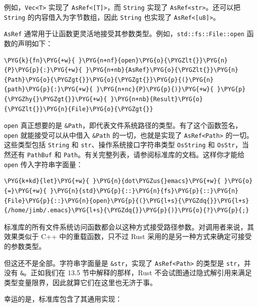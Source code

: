 例如，\texttt{Vec<T>} 实现了 \texttt{AsRef<[T]>}，而 \texttt{String} 实现了 \texttt{AsRef<str>}。还可以把 \texttt{String} 的内容借入为字节数组，因此 \texttt{String} 也实现了 \texttt{AsRef<[u8]>}。

\texttt{AsRef} 通常用于让函数更灵活地接受其参数类型。例如，\texttt{std::fs::File::open} 函数的声明如下：

\begin{Verbatim}[commandchars=\\\{\},breaklines=true,breakanywhere=true,fontsize=\codefont,xleftmargin=17bp]
\PYG{k}{fn}\PYG{+w}{ }\PYG{n+nf}{open}\PYG{o}{\PYGZlt{}}\PYG{n}{P}\PYG{p}{:}\PYG{+w}{ }\PYG{n+nb}{AsRef}\PYG{o}{\PYGZlt{}}\PYG{n}{Path}\PYG{o}{\PYGZgt{}}\PYG{o}{\PYGZgt{}}\PYG{p}{(}\PYG{n}{path}\PYG{p}{:}\PYG{+w}{ }\PYG{n+nc}{P}\PYG{p}{)}\PYG{+w}{ }\PYG{p}{\PYGZhy{}\PYGZgt{}}\PYG{+w}{ }\PYG{n+nb}{Result}\PYG{o}{\PYGZlt{}}\PYG{n}{File}\PYG{o}{\PYGZgt{}}
\end{Verbatim}

\texttt{open} 真正想要的是 \texttt{\&Path}，即代表文件系统路径的类型。有了这个函数签名，\texttt{open} 就能接受可以从中借入 \texttt{\&Path} 的一切，也就是实现了 \texttt{AsRef<Path>} 的一切。这些类型包括 \texttt{String} 和 \texttt{str}、操作系统接口字符串类型 \texttt{OsString} 和 \texttt{OsStr}，当然还有 \texttt{PathBuf} 和 \texttt{Path}。有关完整列表，请参阅标准库的文档。这样你才能给 \texttt{open} 传入字符串字面量：

\begin{Verbatim}[commandchars=\\\{\},breaklines=true,breakanywhere=true,fontsize=\codefont,xleftmargin=17bp]
\PYG{k+kd}{let}\PYG{+w}{ }\PYG{n}{dot\PYGZus{}emacs}\PYG{+w}{ }\PYG{o}{=}\PYG{+w}{ }\PYG{n}{std}\PYG{p}{::}\PYG{n}{fs}\PYG{p}{::}\PYG{n}{File}\PYG{p}{::}\PYG{n}{open}\PYG{p}{(}\PYG{l+s}{\PYGZdq{}}\PYG{l+s}{/home/jimb/.emacs}\PYG{l+s}{\PYGZdq{}}\PYG{p}{)}\PYG{o}{?}\PYG{p}{;}
\end{Verbatim}

标准库的所有文件系统访问函数都会以这种方式接受路径参数。对调用者来说，其效果类似于 C++ 中的重载函数，只不过 Rust 采用的是另一种方式来确定可接受的参数类型。

但这还不是全部。字符串字面量是 \texttt{\&str}，实现了 \texttt{AsRef<Path>} 的类型是 \texttt{str}，并没有 \texttt{\&}。正如我们在 13.5 节中解释的那样，Rust 不会试图通过隐式解引用来满足类型变量限界，因此就算它们在这里也无济于事。

幸运的是，标准库包含了其通用实现：

